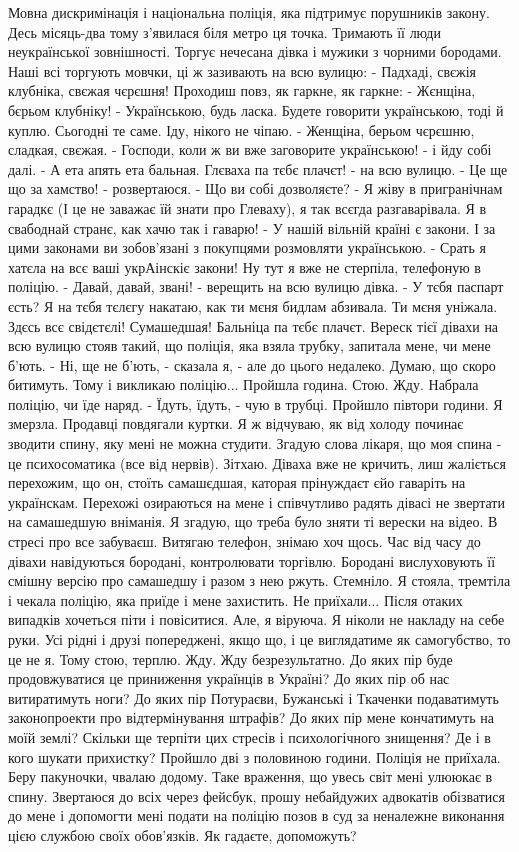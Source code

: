 Мовна дискримінація і національна поліція, яка підтримує порушників закону.
Десь місяць-два тому з'явилася біля метро ця точка. Тримають її люди неукраїнської зовнішності. Торгує нечесана дівка і мужики з чорними бородами. Наші всі торгують мовчки, ці ж зазивають на всю вулицю:
- Падхаді, свєжія клубніка, свєжая чєрєшня! 
Проходиш повз, як гаркне, як гаркне: 
- Жєнщіна, бєрьом клубніку!
- Українською, будь ласка. Будете говорити українською, тоді й куплю. 
Сьогодні те саме. Іду, нікого не чіпаю.
- Женщіна, берьом чєрєшню, сладкая, свєжая.
- Господи, коли ж ви вже заговорите українською! - і йду собі далі.
- А ета апять ета бальная. Глєваха па тєбє плачєт! - на всю вулицю.
- Це ще що за хамство! - розвертаюся. - Що ви собі дозволяєте? 
- Я жіву в пригранічнам гарадкє (І це не заважає їй знати про Глеваху), я так всєгда разгаварівала. Я в свабоднай странє, как хачю так і гаварю!
- У нашій вільній країні є закони. І за цими законами ви зобов'язані з покупцями розмовляти українською.
- Срать я хатєла на всє ваші укрАінскіє закони!
Ну тут я вже не стерпіла, телефоную в поліцію.
- Давай, давай, звані! - верещить на всю вулицю дівка. - У тєбя паспарт єсть? Я на тєбя тєлєгу накатаю, как ти мєня бидлам абзивала. Ти мєня уніжала. Здєсь всє свідєтєлі! Сумашедшая! Бальніца па тєбє плачєт.
Вереск тієї дівахи на всю вулицю стояв такий, що поліція, яка взяла трубку, запитала мене, чи мене б'ють.
 - Ні, ще не б'ють, - сказала я, - але до цього недалеко. Думаю, що скоро битимуть. Тому і викликаю поліцію... 
Пройшла година. Стою. Жду. Набрала поліцію, чи їде наряд.
- Їдуть, їдуть, - чую в трубці. 
Пройшло півтори години. Я змерзла. Продавці повдягали куртки. Я ж відчуваю, як від холоду починає зводити спину, яку мені не можна студити. Згадую слова лікаря, що моя спина - це психосоматика (все від нервів). Зітхаю. Діваха вже не кричить, лиш жаліється перехожим, що он, стоїть самашєдшая, каторая прінуждаєт єйо гаваріть на українскам. Перехожі озираються на мене і співчутливо радять дівасі не звертати на самашедшую вніманія. Я згадую, що треба було зняти ті верески на відео. В стресі про все забуваєш. Витягаю телефон, знімаю хоч щось.
Час від часу до дівахи навідуються бородані, контролювати торгівлю. Бородані вислуховують її смішну версію про самашедшу і разом з нею ржуть. 
Стемніло. Я стояла, тремтіла і чекала поліцію, яка приїде і мене захистить. Не приїхали...
Після отаких випадків хочеться піти і повіситися. Але, я віруюча. Я ніколи не накладу на себе руки. Усі рідні і друзі попереджені, якщо що, і це виглядатиме як самогубство, то це не я. Тому стою, терплю. Жду. Жду безрезультатно.  
До яких пір буде продовжуватися це приниження українців в Україні? До яких пір об нас витиратимуть ноги? До яких пір Потураєви, Бужанські і Ткаченки подаватимуть законопроекти про відтермінування штрафів? 
До яких пір мене кончатимуть на моїй землі? Скільки ще терпіти цих стресів і психологічного знищення? Де і в кого шукати прихистку?
Пройшло дві з половиною години. Поліція не приїхала. Беру пакуночки, чвалаю додому. Таке враження, що увесь світ мені улююкає в спину.
Звертаюся до всіх через фейсбук, прошу небайдужих адвокатів обізватися до мене і допомогти мені подати на поліцію позов в суд за неналежне виконання цією службою своїх обов'язків. 
Як гадаєте, допоможуть?

